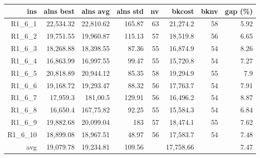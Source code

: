   \begin{table}[caption={Kết quả đo với tập HG\_R\_1\_6 600 yêu cầu}, label=exp:HGR16]
    \small
    \centering
    \begin{tabular}{rrrrrrrr}
    \hline
    ins & alns best & alns avg & alns std & nv & bkcost & bknv & gap (\%) \\ \hline
    R1\_6\_1 & 22,534.32 & 22,810.62 & 165.87 & 63 & 21,274.2 & 58 & 5.92 \\ \hline
    R1\_6\_2 & 19,751.55 & 19,960.87 & 115.13 & 57 & 18,519.8 & 56 & 6.65 \\ \hline
    R1\_6\_3 & 18,268.88 & 18,398.55 & 87.36 & 55 & 16,874.9 & 54 & 8.26 \\ \hline
    R1\_6\_4 & 16,863.99 & 16,997.55 & 99.47 & 55 & 15,720.8 & 54 & 7.27 \\ \hline
    R1\_6\_5 & 20,818.89 & 20,944.12 & 85.35 & 58 & 19,294.9 & 55 & 7.9 \\ \hline
    R1\_6\_6 & 19,168.72 & 19,293.47 & 88.32 & 56 & 17,763.7 & 54 & 7.91 \\ \hline
    R1\_6\_7 & 17,959.3 & 181,00.5 & 129.91 & 56 & 16,496.2 & 54 & 8.87 \\ \hline
    R1\_6\_8 & 16,650.4 & 167,75.82 & 92.25 & 55 & 15,584.3 & 54 & 6.84 \\ \hline
    R1\_6\_9 & 19,882.68 & 20,099.04 & 183 & 57 & 18,474.1 & 55 & 7.62 \\ \hline
    R1\_6\_10 & 18,899.08 & 18,967.51 & 48.97 & 56 & 17,583.7 & 54 & 7.48 \\ \hline
    avg & 19,079.78 & 19,234.81 & 109.56 & & 17,758.66 & & 7.47 \\ \hline
    \end{tabular}
  \end{table}


